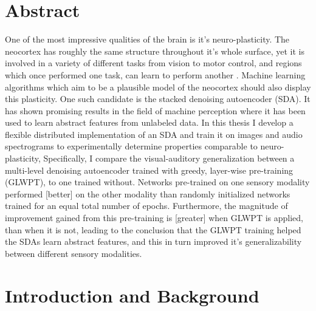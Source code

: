 \documentclass[12pt]{article}
\begin{document}
\section{Abstract}
\label{Abstract}
\begin{doublespacing}

One of the most impressive qualities of the brain is it's neuro-plasticity. The neocortex has roughly the same structure throughout it's whole surface, yet it is involved in a variety of different tasks from vision to motor control, and regions which once performed one task, can learn to perform another \cite{hawkins2004intelligence}. Machine learning algorithms which aim to be a plausible model of the neocortex should also display this plasticity. One such candidate is the stacked denoising autoencoder (SDA). It has shown promising results in the field of machine perception where it has been used to learn abstract features from unlabeled data. \cite{larochelle2007empirical, le2011building, vincent2008extracting} In this thesis I develop a flexible distributed implementation of an SDA and train it on images and audio spectrograms to experimentally determine properties comparable to neuro-plasticity, Specifically, I compare the visual-auditory generalization between a multi-level denoising autoencoder trained with greedy, layer-wise pre-training (GLWPT), to one trained without. Networks pre-trained on one sensory modality performed [better] on the other modality than randomly initialized networks trained for an equal total number of epochs. Furthermore, the magnitude of improvement gained from this pre-training is [greater] when GLWPT is applied, than when it is not, leading to the conclusion that the GLWPT training helped the SDAs learn abstract features, and this in turn improved it's generalizability between different sensory modalities. 

\section{Introduction and Background}


\end{doublespacing}
\end{document}
